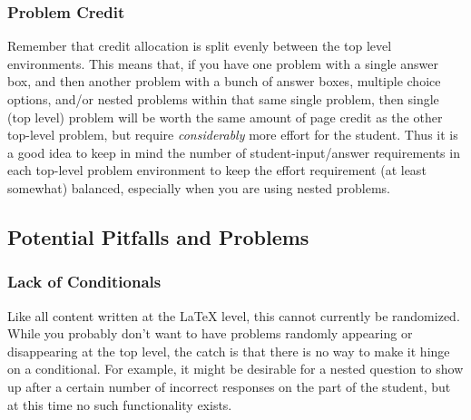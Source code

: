 \documentclass{ximera}
\begin{document}
        \subsubsection*{Problem Credit}
            Remember that credit allocation is split evenly between the top level environments. This means that, if you have one problem with a single answer box, and then another problem with a bunch of answer boxes, multiple choice options, and/or nested problems within that same single problem, then single (top level) problem will be worth the same amount of page credit as the other top-level problem, but require \textit{considerably} more effort for the student. Thus it is a good idea to keep in mind the number of student-input/answer requirements in each top-level problem environment to keep the effort requirement (at least somewhat) balanced, especially when you are using nested problems.
    
    \subsection{Potential Pitfalls and Problems}
        \subsubsection{Lack of Conditionals}
            Like all content written at the LaTeX level, this cannot currently be randomized.  While you probably don't want to have problems randomly appearing or disappearing at the top level, the catch is that there is no way to make it hinge on a conditional.  For example, it might be desirable for a nested question to show up after a certain number of incorrect responses on the part of the student, but at this time no such functionality exists.
\end{document}
